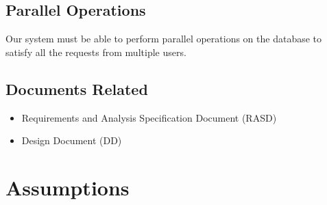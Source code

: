 		\subsection{Parallel Operations}
		Our system must be able to perform parallel operations on the database to satisfy all the requests from multiple users.

		\subsection{Documents Related}

			\begin{itemize}
				\item Requirements and Analysis Specification Document (RASD)

				\item Design Document (DD)
			\end{itemize}

	\section{Assumptions}

